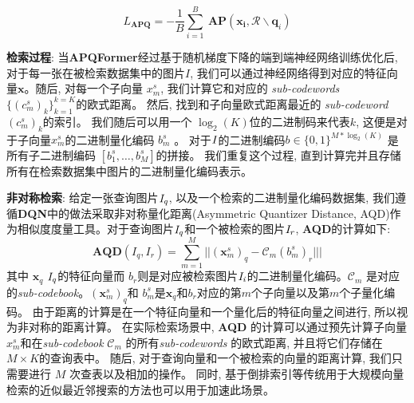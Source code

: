\begin{equation}
    L_{\textbf{APQ}} = - \frac{1}{B}\sum_{i=1}^{B} \ \mathbf{AP}(\mathbf{x_i}, \mathcal{R} \backslash \mathbf{q}_i)
\end{equation}\par
\textbf{检索过程}: 当\textbf{APQFormer}经过基于随机梯度下降的端到端神经网络训练优化后, 对于每一张在被检索数据集中的图片$I$, 我们可以通过神经网络得到对应的特征向量$\mathbf{x}$。随后, 对每一个子向量 $x_m^s$, 我们计算它和对应的 \textit{sub-codewords}$\{ (c_m^s)_k \}_{k=1}^{k=K}$的欧式距离。 然后, 找到和子向量欧式距离最近的 \textit{sub-codeword} $(c_m^s)_k$的索引。 我们随后可以用一个 $\log_2 (K)$位的二进制码来代表$k$, 这便是对于子向量$x_m^s$的二进制量化编码 $b_m^s$ 。
对于$\it{I}$的二进制编码$b \in \{0,1\}^{M*\log_2(K)}$ 是所有子二进制编码 $[b_1^s,\ldots,b_M^s]$的拼接。 我们重复这个过程, 直到计算完并且存储所有在检索数据集中图片的二进制量化编码表示。\par
\textbf{非对称检索}:  
给定一张查询图片$\it{I}_q$, 以及一个检索的二进制量化编码数据集, 我们遵循\textbf{DQN}中的做法采取非对称量化距离(Asymmetric Quantizer Distance, AQD)作为相似度度量工具。对于查询图片$\it{I}_q$和一个被检索的图片$\it{I}_r$, \textbf{AQD}的计算如下:
\begin{equation}
    \mathbf{AQD}(I_q,I_r) = \sum_{m=1}^{M} || (\mathbf{x}_m^s)_q - \mathcal{C}_m (b_m^s)_r |||
\end{equation}
其中 $\mathbf{x}_q$ $\it{I}_q$的特征向量而 $b_r$则是对应被检索图片$\it{I}_i$的二进制量化编码。$\mathcal{C}_m$ 是对应的\textit{sub-codebook}。$(\mathbf{x}_m^s)_q$和 $b_m^s$是$\mathbf{x}_q$和$b_r$对应的第$m$个子向量以及第$m$个子量化编码。
由于距离的计算是在一个特征向量和一个量化后的特征向量之间进行, 所以视为非对称的距离计算。 在实际检索场景中, \textbf{AQD} 的计算可以通过预先计算子向量$x_m^s$和在\textit{sub-codebook} $\mathcal{C}_m$ 的所有\textit{sub-codewords} 的欧式距离, 并且将它们存储在 $M \times K$的查询表中。 随后, 对于查询向量和一个被检索的向量的距离计算, 我们只需要进行 $M$ 次查表以及相加的操作。 同时, 基于倒排索引\cite{babenko2014inverted}等传统用于大规模向量检索的近似最近邻搜索的方法也可以用于加速此场景。

